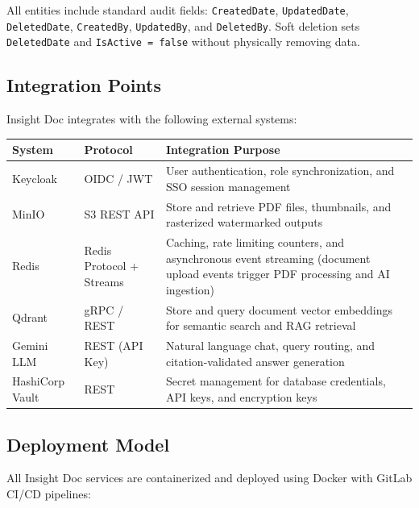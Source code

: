 \begin{ugNote}
  All entities include standard audit fields:
  \texttt{CreatedDate}, \texttt{UpdatedDate},
  \texttt{DeletedDate}, \texttt{CreatedBy},
  \texttt{UpdatedBy}, and \texttt{DeletedBy}. Soft deletion
  sets \texttt{DeletedDate} and \texttt{IsActive = false}
  without physically removing data.
\end{ugNote}

\subsection{Integration Points}

Insight Doc integrates with the following external systems:

\begin{tabularx}{\textwidth}{@{} l l X @{}}
  \toprule
  \textbf{System} & \textbf{Protocol}
    & \textbf{Integration Purpose} \\
  \midrule
  Keycloak
    & OIDC / JWT
    & User authentication, role synchronization, and
      SSO session management \\
  MinIO
    & S3 REST API
    & Store and retrieve PDF files, thumbnails, and
      rasterized watermarked outputs \\
  Redis
    & Redis Protocol + Streams
    & Caching, rate limiting counters, and asynchronous
      event streaming (document upload events trigger
      PDF processing and AI ingestion) \\
  Qdrant
    & gRPC / REST
    & Store and query document vector embeddings for
      semantic search and RAG retrieval \\
  Gemini LLM
    & REST (API Key)
    & Natural language chat, query routing, and
      citation-validated answer generation \\
  HashiCorp Vault
    & REST
    & Secret management for database credentials, API
      keys, and encryption keys \\
  \bottomrule
\end{tabularx}

\subsection{Deployment Model}

All Insight Doc services are containerized and deployed using
Docker with GitLab CI/CD pipelines:

